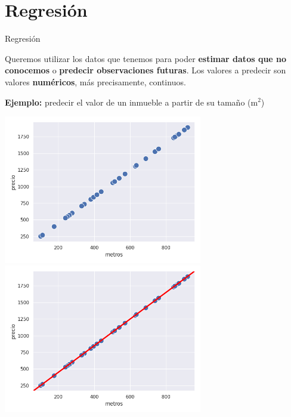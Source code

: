 \documentclass[aspectratio=169, usenames,dvipsnames]{beamer}
\begin{document}
\section{Regresión}

\begin{frame}
    \Huge{Regresión}
    \vspace{0.5em}
    
    \normalsize
    Queremos utilizar los datos que tenemos para poder \textbf{estimar datos que no conocemos} o \textbf{predecir observaciones futuras}. Los valores a predecir son valores \textbf{numéricos}, más precisamente, continuos.

    \vspace{1cm}
    \textbf{Ejemplo:} predecir el valor de un inmueble a partir de su tamaño (m$^2$)
    
\end{frame}

\begin{frame}
    \centering
    \vspace{-0.9cm}
    \begin{overprint}
    \centering\includegraphics[width=0.65\textwidth]{img/regresion_ej_01.png}
    \centering\includegraphics[width=0.65\textwidth]{img/regresion_ej_01_ok.png}
    \end{overprint}  
\end{frame}
\end{document}
